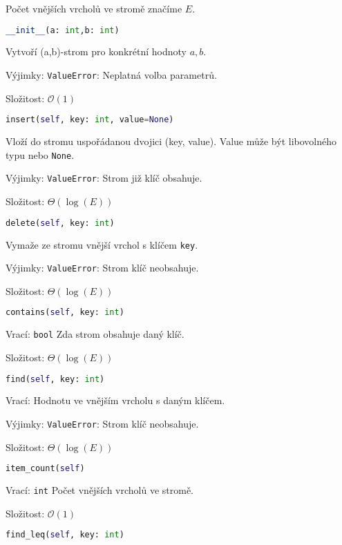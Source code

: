 \documentclass[a4paper,11pt,openany]{article}
\begin{document}
Počet vnějších vrcholů ve stromě značíme $E$.

\begin{lstlisting}[language=python,frame=none]
__init__(a: int,b: int)
\end{lstlisting}
Vytvoří (a,b)-strom pro konkrétní hodnoty $a,b$.

Výjimky: \texttt{ValueError}: Neplatná volba parametrů.

Složitost: $\mathcal{O}(1)$
\begin{lstlisting}[language=python,frame=none]
insert(self, key: int, value=None)
\end{lstlisting}
Vloží do stromu uspořádanou dvojici (key, value). Value může být libovolného typu nebo \texttt{None}.

Výjimky: \texttt{ValueError}: Strom již klíč obsahuje.

Složitost: $\Theta(\log(E))$

\begin{lstlisting}[language=python,frame=none]
delete(self, key: int)
\end{lstlisting}
Vymaže ze stromu vnější vrchol s klíčem \texttt{key}.

Výjimky: \texttt{ValueError}: Strom klíč neobsahuje.

Složitost: $\Theta(\log(E))$

\begin{lstlisting}[language=python,frame=none]
contains(self, key: int)
\end{lstlisting}

Vrací: \texttt{bool} Zda strom obsahuje daný klíč.

Složitost: $\Theta(\log(E))$

\begin{lstlisting}[language=python,frame=none]
find(self, key: int)
\end{lstlisting}

Vrací: Hodnotu ve vnějším vrcholu s daným klíčem.

Výjimky: \texttt{ValueError}: Strom klíč neobsahuje.

Složitost: $\Theta(\log(E))$

\begin{lstlisting}[language=python,frame=none]
item_count(self)
\end{lstlisting}

Vrací: \texttt{int} Počet vnějších vrcholů ve stromě.

Složitost: $\mathcal{O}(1)$

\begin{lstlisting}[language=python,frame=none]
find_leq(self, key: int)
\end{lstlisting}
\end{document}
